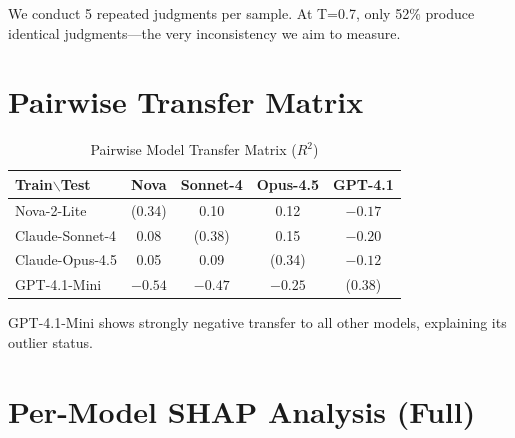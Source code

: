 \documentclass[sigconf,anonymous,review]{acmart}
\begin{document}
We conduct 5 repeated judgments per sample. At T=0.7, only 52\% produce identical judgments---the very inconsistency we aim to measure.

\section{Pairwise Transfer Matrix}
\label{app:transfer}

\begin{table}[h]
\centering
\caption{Pairwise Model Transfer Matrix ($R^2$)}
\small
\begin{tabular}{@{}lcccc@{}}
\toprule
\textbf{Train$\backslash$Test} & \textbf{Nova} & \textbf{Sonnet-4} & \textbf{Opus-4.5} & \textbf{GPT-4.1} \\
\midrule
Nova-2-Lite & (0.34) & 0.10 & 0.12 & $-0.17$ \\
Claude-Sonnet-4 & 0.08 & (0.38) & 0.15 & $-0.20$ \\
Claude-Opus-4.5 & 0.05 & 0.09 & (0.34) & $-0.12$ \\
GPT-4.1-Mini & $-0.54$ & $-0.47$ & $-0.25$ & (0.38) \\
\bottomrule
\end{tabular}
\end{table}

GPT-4.1-Mini shows strongly negative transfer to all other models, explaining its outlier status.

\section{Per-Model SHAP Analysis (Full)}
\label{app:permodel_shap}
\end{document}
